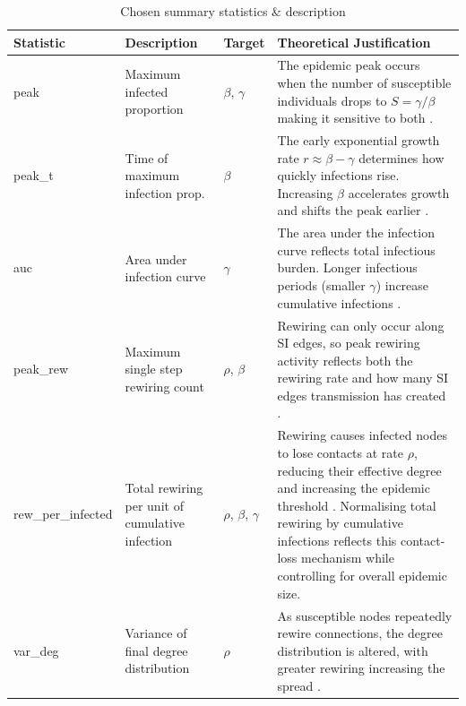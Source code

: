 \documentclass[12pt, a4paper]{article}
\begin{document}
\begin{table}[H]
\centering
\small
\begin{tabular}{p{2.75cm}p{3.25cm}p{1.5cm}p{7cm}}
\toprule
\textbf{Statistic} & \textbf{Description} & \textbf{Target} & \textbf{Theoretical Justification} \\
\midrule

peak
& Maximum infected proportion
& $\beta$, $\gamma$
& The epidemic peak occurs when the number of susceptible individuals drops to $S = \gamma / \beta$ making it sensitive to both \citep{Kermack1927}.\\
\addlinespace

peak\_t
& Time of maximum infection prop.
& $\beta$
& The early exponential growth rate $r \approx \beta - \gamma$ determines how quickly infections rise. Increasing $\beta$ accelerates growth and shifts the peak earlier \citep{Kermack1927}. \\
\addlinespace

auc
& Area under infection curve
& $\gamma$
& The area under the infection curve reflects total infectious burden. Longer infectious periods (smaller $\gamma$) increase cumulative infections \citep{Kermack1927}. \\
\addlinespace

peak\_rew
& Maximum single step rewiring count
& $\rho$, $\beta$
& Rewiring can only occur along SI edges, so peak rewiring activity reflects both the rewiring rate and how many SI edges transmission has created \citep{gross2006epidemic}. \\
\addlinespace

rew\_per\_infected
& Total rewiring per unit of cumulative infection
& $\rho$, $\beta$, $\gamma$
& Rewiring causes infected nodes to lose contacts at rate $\rho$, reducing their effective degree and increasing the epidemic threshold \citep{gross2006epidemic}. Normalising total rewiring by cumulative infections reflects this contact-loss mechanism while controlling for overall epidemic size.\\
\addlinespace

var\_deg
& Variance of final degree distribution
& $\rho$
& As susceptible nodes repeatedly rewire connections, the degree distribution is altered, with greater rewiring increasing the spread \citep{shaw2008fluctuating}. \\

\bottomrule
\end{tabular}
\caption{Chosen summary statistics \& description}
\end{table}
\end{document}
